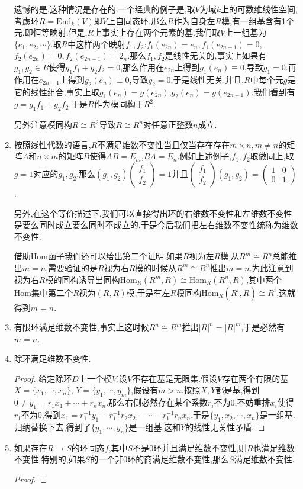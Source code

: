 \begin{enumerate}
	遗憾的是,这种情况是存在的.一个经典的例子是,取$V$为域$k$上的可数维线性空间,考虑环$R=\mathrm{End}_k(V)$即$V$上自同态环.那么$R$作为自身左$R$模,有一组基含有1个元,即恒等映射.但是,$R$上事实上存在两个元素的基.我们取$V$上一组基为$\{e_1,e_2,\cdots\}$.取$R$中这样两个映射$f_1,f_2$:$f_1(e_ {2n})=e_n,f_1(e_{2n-1})=0$,$f_2(e_{2n})=0,f_2(e_{2n-1})=2_n$.那么$f_1,f_2$是线性无关的,事实上如果有$g_1,g_2\in R$使得$g_1f_1+g_2f_2=0$,那么作用在$e_{2n}$上得到$g_1(e_n)\equiv0$,导致$g_1=0$.再作用在$e_{2n-1}$上得到$g_2(e_n)\equiv0$,导致$g_2=0$.于是线性无关.并且,$R$中每个元$g$是它的线性组合,事实上取$g_1(e_n)=g(e_ {2n})$,$g_2(e_n)=g(e_{2n-1})$.我们看到有$g=g_1f_1+g_2f_2$.于是$R$作为模同构于$R^2$.
	
	另外注意模同构$R\cong R^2$导致$R\cong R^n$对任意正整数$n$成立.
	\item 按照线性代数的语言,$R$不满足维数不变性当且仅当存在存在$m\times n,m\not=n$的矩阵$A$和$n\times m$的矩阵$B$使得$AB=E_m$,$BA=E_n$.例如上述例子,$f_1,f_2$取做同上,取$g=1$对应的$g_1,g_2$,那么$\left(g_1,g_2\right)\left(\begin{array}{c} f_1\\ f_2\end{array}\right)=1$并且$\left(\begin{array}{c} f_1\\ f_2\end{array}\right)\left(g_1,g_2\right)=\left(\begin{array}{cc}1&0\\0&1\end{array}\right)$.
	
	另外,在这个等价描述下,我们可以直接得出环的右维数不变性和左维数不变性是要么同时成立要么同时不成立的.于是今后我们把左右维数不变性统称为维数不变性.
	
	借助Hom函子我们还可以给出第二个证明.如果$R$视为左$R$模,从$R^m\cong R^n$总能推出$m=n$,需要验证的是$R$视为右$R$模的时候从$R^m\cong R^n$推出$m=n$.为此注意到视为右$R$模的同构诱导出同构$\mathrm{Hom}_R(R^m,R)\cong\mathrm{Hom}_R(R^n,R)$,其中两个Hom集中第二个$R$视为$(R,R)$模,于是有左$R$模同构$\mathrm{Hom}_R(R^i,R)\cong R^i$,这就得到$m=n$.
	\item 有限环满足维数不变性,事实上这时候$R^n\cong R^m$推出$|R|^n=|R|^m$,于是必然有$m=n$.
	\item 除环满足维数不变性.
	\begin{proof}
		
		给定除环$D$上一个模$V$.设$V$不存在基是无限集.假设$V$存在两个有限的基$X=\{x_1,\cdots,x_n\}$, $Y=\{y_1,\cdots,y_m\}$,假设有$m>n$.按照$X,Y$都是基,得到$0\not=y_1=r_1x_1+\cdots+r_nx_n$.那么右侧必然存在某个系数$r_i$不为0,不妨重排$x_i$使得$r_1$不为0,得到$x_1=r_1^ {-1}y_1-r_1^{-1}r_{2}x_{2}-\cdots-r_1^{-1}r_nx_n$.于是$\{y_1,x_2,\cdots,x_n\}$是一组基.归纳替换下去,得到了$\{y_1,\cdots,y_n\}$是一组基,这和$Y$的线性无关性矛盾.
	\end{proof}
	\item 如果存在$R\to S$的环同态$f$,其中$S$不是0环并且满足维数不变性,则$R$也满足维数不变性.特别的,如果$S$的一个非0环的商满足维数不变性,那么$S$满足维数不变性.
	\begin{proof}
		

\end{proof}
\end{enumerate}
